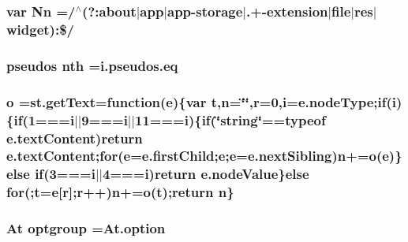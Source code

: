 \hypertarget{jquery-1_89_81_8min_8js_a03586bb881647685652f72d98d189ed0}{
\subsubsection[{Nn}]{\setlength{\rightskip}{0pt plus 5cm}var Nn =/$^\wedge$(?\-:about$\vert$app$\vert$app-\/storage$\vert$.+-\/extension$\vert$file$\vert$res$\vert${\bf widget})\-:\$/}}\label{jquery-1_89_81_8min_8js_a03586bb881647685652f72d98d189ed0}
\hypertarget{jquery-1_89_81_8min_8js_ac2d2e92e2eabd068ce52dd023bada1eb}{
\subsubsection[{nth}]{ pseudos nth =i.\-pseudos.\-eq}}\label{jquery-1_89_81_8min_8js_ac2d2e92e2eabd068ce52dd023bada1eb}
\hypertarget{jquery-1_89_81_8min_8js_ae47ca7a09cf6781e29634502345930a7}{
\subsubsection[{o}]{\setlength{\rightskip}{0pt plus 5cm}o =st.\-get\-Text=function({\bf e})\{var {\bf t},{\bf n}=\char`\"{}\char`\"{},{\bf r}=0,{\bf i}=e.\-node\-Type;{\bf if}({\bf i})\{{\bf if}(1==={\bf i}$\vert$$\vert$9==={\bf i}$\vert$$\vert$11==={\bf i})\{{\bf if}(\char`\"{}string\char`\"{}==typeof e.\-text\-Content)return e.\-text\-Content;{\bf for}({\bf e}=e.\-first\-Child;{\bf e};{\bf e}=e.\-next\-Sibling){\bf n}+=o({\bf e})\}else {\bf if}(3==={\bf i}$\vert$$\vert$4==={\bf i})return e.\-node\-Value\}else {\bf for}(;{\bf t}={\bf e}\mbox{[}{\bf r}\mbox{]};{\bf r}++){\bf n}+=o({\bf t});return {\bf n}\}}}\label{jquery-1_89_81_8min_8js_ae47ca7a09cf6781e29634502345930a7}
\hypertarget{jquery-1_89_81_8min_8js_a840c33aded79e5ee1c6abb143ea2c967}{
\subsubsection[{optgroup}]{\setlength{\rightskip}{0pt plus 5cm}At optgroup =At.\-option}}\label{jquery-1_89_81_8min_8js_a840c33aded79e5ee1c6abb143ea2c967}

